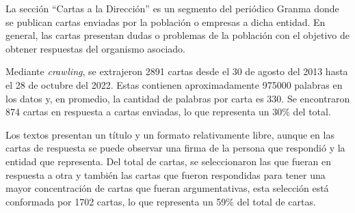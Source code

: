 \documentclass[a4paper,11pt,twocolumn,twoside]{article}
\begin{document}
La sección ``Cartas a la Dirección'' \cite{gallego2013cartas} es un segmento del periódico Granma donde se publican
cartas enviadas por la población o empresas a dicha entidad. En general, las cartas 
presentan dudas o problemas de la población con el objetivo de obtener respuestas del organismo
asociado. 

Mediante \textit{crawling}, se extrajeron 2891 cartas desde el 30 de agosto del 2013 hasta el 28 de octubre del 2022. Estas 
contienen aproximadamente 975000 palabras en los datos y, en promedio, la cantidad de palabras por carta es 330.
Se encontraron 874 cartas en respuesta a cartas enviadas, lo que representa un 30\% del total. 

Los textos presentan un título y un formato relativamente libre, 
aunque en las cartas de respuesta se puede observar una firma de la persona que respondió y la entidad que 
representa. Del total de cartas, se seleccionaron las que fueran en respuesta a otra y también las 
cartas que fueron respondidas para tener una mayor concentración de cartas que fueran argumentativas, 
esta selección está conformada por 1702 cartas, lo que representa un 59\% del total de cartas.


\end{document}
